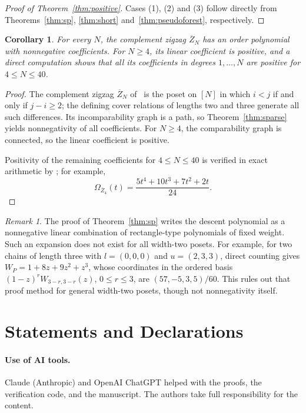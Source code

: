 \documentclass[11pt]{amsart}
\newtheorem{corollary}[theorem]{Corollary}
\theoremstyle{remark}
\newtheorem{remark}[theorem]{Remark}
\numberwithin{equation}{section}
\begin{document}
\begin{proof}[Proof of Theorem~\ref{thm:positive}]
Cases (1), (2) and (3) follow directly from Theorems~\ref{thm:sp},
\ref{thm:short} and~\ref{thm:pseudoforest}, respectively.
\end{proof}

\begin{corollary}\label{cor:zigzag}
For every $N$, the complement zigzag $\overline Z_N$ has an order polynomial with
nonnegative coefficients. For $N\ge4$, its linear coefficient is positive, and a
direct computation shows that all its coefficients in degrees $1,\dots,N$ are
positive for $4\le N\le40$.
\end{corollary}

\begin{proof}
The complement zigzag $\overline Z_N$ of~\cite[Remark~7.3]{FMP} is the poset on
$[N]$ in which $i<j$ if and only if $j-i\ge2$; the defining cover relations of
lengths two and three generate all such differences. Its incomparability graph
is a path, so Theorem~\ref{thm:sparse} yields nonnegativity of all
coefficients. For $N\ge4$, the comparability graph is connected, so the linear
coefficient is positive.

Positivity of the remaining coefficients for $4\le N\le40$ is verified in exact
arithmetic by ; for example,
\[
 \Omega_{\overline Z_4}(t)=\frac{5t^4+10t^3+7t^2+2t}{24}.
\]
\end{proof}

\begin{remark}
The proof of Theorem~\ref{thm:sp} writes the descent polynomial as a
nonnegative linear combination of rectangle-type polynomials of fixed weight.
Such an expansion does not exist for all width-two posets. For example, for two
chains of length three with $l=(0,0,0)$ and $u=(2,3,3)$, direct counting gives
$W_P=1+8z+9z^2+z^3$, whose coordinates in the ordered basis
$(1-z)^rW_{3-r,3-r}(z)$, $0\le r\le3$, are $(57,-5,3,5)/60$. This rules out
that proof method for general width-two posets, though not nonnegativity
itself.
\end{remark}

\section*{Statements and Declarations}

\paragraph{Use of AI tools.} Claude (Anthropic) and OpenAI ChatGPT helped with the proofs, the verification
code, and the manuscript. The authors take full responsibility for the content.
\end{document}
